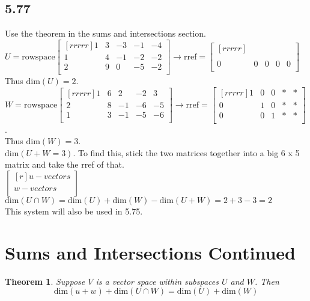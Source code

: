 \documentclass{report}
\newtheorem*{thrm}{Theorem}
\begin{document}
\subsection{5.77}
Use the theorem in the sums and intersections section.
$U=\mathrm{rowspace}\begin{bmatrix}[rrrrr]1&3&-3&-1&-4\\1&4&-1&-2&-2\\2&9&0&-5&-2\\\end{bmatrix} \rightarrow \mathrm{rref}=\begin{bmatrix}[rrrrr]{}\\ {}\\ 0&0&0&0&0\\\end{bmatrix}$\\
Thus $\mathrm{dim}(U)=2$.\\
$W=\mathrm{rowspace}\begin{bmatrix}[rrrrr]1&6&2&-2&3\\2&8&-1&-6&-5\\1&3&-1&-5&-6\\\end{bmatrix} \rightarrow \mathrm{rref}=\begin{bmatrix}[rrrrr]1&0&0&*&*\\0&1&0&*&*\\0&0&1&*&*\\\end{bmatrix}$.\\
Thus $\mathrm{dim}(W)=3$.\\
$\mathrm{dim}(U+W=3)$. To find this, stick the two matrices together into a big 6 x 5 matrix and take the rref of that.\\
$\begin{bmatrix}[r]u-vectors\\ \hline w-vectors\\\end{bmatrix}$\\
$\mathrm{dim}(U\cap W) = \mathrm{dim}(U) + \mathrm{dim}(W) - \mathrm{dim}(U+W) = 2+3-3=2$\\
This system will also be used in 5.75.

\section{Sums and Intersections Continued}
\begin{thrm}
Suppose $V$ is a vector space within subspaces $U$ and $W$. Then 
\[ \mathrm{dim}(u+w)+\mathrm{dim}(U\cap W) = \mathrm{dim}(U)+\mathrm{dim}(W) \]
\end{thrm}
\end{document}
